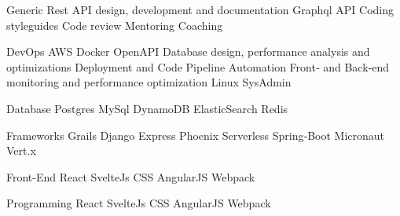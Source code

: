 

\begin{cvskills}

  \cvskill
    {Generic} %
    {Rest API design, development and documentation {\enskip\cdotp\enskip} Graphql API {\enskip\cdotp\enskip} Coding styleguides {\enskip\cdotp\enskip} Code review {\enskip\cdotp\enskip}\newline Mentoring {\enskip\cdotp\enskip} Coaching} %

  \cvskill
    {DevOps} %
    {AWS {\enskip\cdotp\enskip} Docker {\enskip\cdotp\enskip} OpenAPI {\enskip\cdotp\enskip} Database design, performance analysis and optimizations {\enskip\cdotp\enskip}\newline Deployment and Code Pipeline Automation {\enskip\cdotp\enskip}\newline Front‑ and Back‑end monitoring and performance optimization {\enskip\cdotp\enskip} Linux SysAdmin} %

  \cvskill
    {Database} %
    {Postgres {\enskip\cdotp\enskip} MySql {\enskip\cdotp\enskip} DynamoDB {\enskip\cdotp\enskip} ElasticSearch {\enskip\cdotp\enskip} Redis} %

  \cvskill
    {Frameworks} %
    {Grails {\enskip\cdotp\enskip} Django {\enskip\cdotp\enskip} Express {\enskip\cdotp\enskip} Phoenix {\enskip\cdotp\enskip} Serverless {\enskip\cdotp\enskip} Spring‑Boot {\enskip\cdotp\enskip} Micronaut {\enskip\cdotp\enskip} Vert.x} %

  \cvskill
    {Front-End} %
    {React {\enskip\cdotp\enskip} SvelteJs {\enskip\cdotp\enskip} CSS {\enskip\cdotp\enskip} AngularJS {\enskip\cdotp\enskip} Webpack} %

  \cvskill
    {Programming} %
    {React {\enskip\cdotp\enskip} SvelteJs {\enskip\cdotp\enskip} CSS {\enskip\cdotp\enskip} AngularJS {\enskip\cdotp\enskip} Webpack} %


\end{cvskills}
